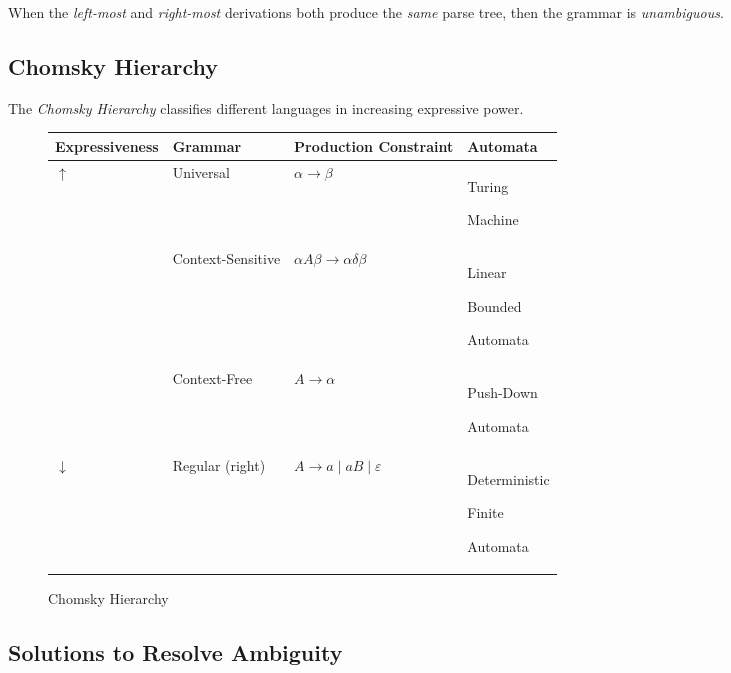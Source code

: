 \begin{example}
    When the \textit{left-most} and \textit{right-most} derivations both produce the \textit{same} parse tree, then the grammar is \textit{unambiguous}.
\end{example}

\subsection{Chomsky Hierarchy}

\begin{definition}
    The \textit{Chomsky Hierarchy} classifies different languages in increasing expressive power.
    
    \begin{figure}[H]
        \centering
        \begin{tabularx}{\textwidth}{@{} X X X X @{}}
            \toprule
            Expressiveness & Grammar & Production Constraint & Automata \\
            \midrule
            $\uparrow$ & Universal & $\alpha \to \beta$ & Turing \par Machine \\
            \phantom{} & Context-Sensitive & $\alpha A \beta \to \alpha \delta \beta$ & Linear \par Bounded \par Automata \\
            \phantom{} & Context-Free & $A \to \alpha$ & Push-Down \par Automata \\
            $\downarrow$ & Regular (right) & $A \to a \mid aB \mid \varepsilon$ & Deterministic \par Finite \par Automata \\
            \bottomrule
        \end{tabularx}
        \caption{Chomsky Hierarchy}
        \label{fig:chomsky-hierarachy}
    \end{figure}
\end{definition}

\subsection{Solutions to Resolve Ambiguity}

